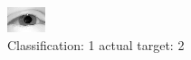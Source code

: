 \begin{figure}[h!]
\begin{center}
\includegraphics[width=0.60\columnwidth]{figures/ID2366_class_1_target_2.png}
\end{center}
\caption{ Classification: 1 actual target: 2}
\label{fig:ID2366_class_1_target_2}
\end{figure}
